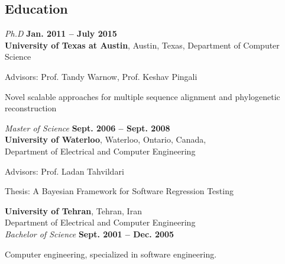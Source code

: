 \documentclass[margin,line,letterpaper]{resume}
\begin{document}
\begin{resume}
    \section{\mysidestyle Education}
    \textsl{Ph.D}  \hfill \textbf{ Jan. 2011 -- July 2015}\\
    \textbf{University of Texas at Austin}, Austin, Texas, Department of Computer Science\vspace{-3mm}\\\vspace{-1mm}%
    \begin{list2}
        \item Advisors:  Prof. Tandy Warnow, Prof. Keshav Pingali
        \item Novel scalable approaches for multiple sequence
alignment and phylogenetic reconstruction
    \end{list2}\vspace{-1.5mm}
    
    \textsl{Master of Science} \hfill \textbf{ Sept. 2006 -- Sept. 2008}\\\vspace{1mm}%
    \textbf{University of Waterloo}, Waterloo, Ontario, Canada,\\
    Department of Electrical and Computer Engineering\vspace{-3mm}\\\vspace{-1mm}%
    \begin{list2}
        \item Advisors:  Prof. Ladan Tahvildari
        \item Thesis: A Bayesian Framework for Software Regression Testing
    \end{list2}\vspace{-1.5mm}
    \textbf{University of Tehran}, Tehran, Iran\\
    Department of Electrical and Computer Engineering \vspace{2mm}\\\vspace{1mm}%
    \textsl{Bachelor of Science} \hfill \textbf{ Sept. 2001 -- Dec. 2005}\vspace{-3mm}\\\vspace{-1mm}%
    \begin{list2}
        \item Computer engineering, specialized in software engineering.
    \end{list2}\vspace{-1.5mm}


\end{resume}
\end{document}
